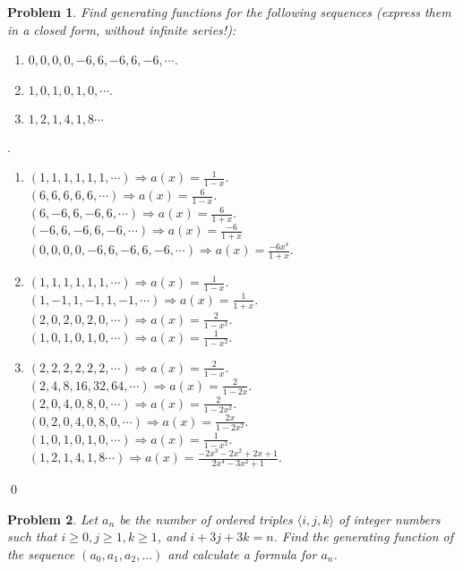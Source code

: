 \documentclass[12pt]{article}
\newtheorem{hw}{Problem}
\newenvironment{sol}
  {\par\vspace{3mm}\noindent{\it Solution}.}
  {\qed}
\begin{document}
\begin{hw} Find generating functions for the following sequences (express them in a closed form, without infinite series!):
\begin{enumerate}
  \item $0,0,0,0,-6,6,-6,6,-6,\cdots$.
  \item $1,0,1,0,1,0,\cdots.$
  \item $1,2,1,4,1,8\cdots$
\end{enumerate}
\end{hw}

\begin{sol}
    \begin{enumerate}
        \item $(1,1,1,1,1,1,\cdots)\Rightarrow a(x)=\frac{1}{1-x} $.
        \\$(6,6,6,6,6,\cdots) \Rightarrow a(x)=\frac{6}{1-x}$.
        \\$(6,-6,6,-6,6,\cdots) \Rightarrow a(x)=\frac{6}{1+x}$.
        \\$(-6,6,-6,6,-6,\cdots)\Rightarrow a(x)=\frac{-6}{1+x}$
        \\$(0,0,0,0,-6,6,-6,6,-6,\cdots) \Rightarrow a(x)=\frac{-6x^4}{1+x}$.
        \item $(1,1,1,1,1,1,\cdots)\Rightarrow a(x)=\frac{1}{1-x} $.
        \\$(1,-1,1,-1,1,-1,\cdots)\Rightarrow a(x)=\frac{1}{1+x} $.
        \\$(2,0,2,0,2,0,\cdots)\Rightarrow a(x)=\frac{2}{1-x^2}$.
        \\$(1,0,1,0,1,0,\cdots)\Rightarrow a(x)=\frac{1}{1-x^2}$.
        \item $(2,2,2,2,2,2,\cdots)\Rightarrow a(x)=\frac{2}{1-x} $.
        \\$(2,4,8,16,32,64,\cdots)\Rightarrow a(x)=\frac{2}{1-2x} $.
        \\$(2,0,4,0,8,0,\cdots)\Rightarrow a(x)=\frac{2}{1-2x^2} $.
        \\$(0,2,0,4,0,8,0,\cdots)\Rightarrow a(x)=\frac{2x}{1-2x^2} $.
        \\$(1,0,1,0,1,0,\cdots)\Rightarrow a(x)=\frac{1}{1-x^2}$.
        \\$(1,2,1,4,1,8\cdots)\Rightarrow a(x)=\frac{-2x^3-2x^2+2x+1}{2x^4-3x^2+1}$.
    \end{enumerate}
\end{sol}




\begin{hw}
Let $a_n$ be the number of ordered triples $\langle i,j,k\rangle$ of integer numbers such that $i\geq 0,j\geq 1, k\geq 1$, and $i+3j+3k=n$. Find the generating function of the sequence $(a_0, a_1, a_2, \ldots)$ and calculate a formula for $a_n$.
\end{hw}
\end{document}
